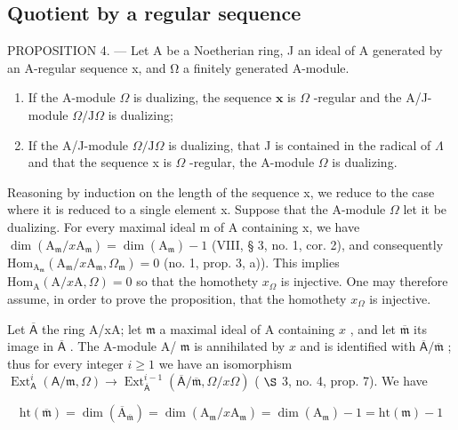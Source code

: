 \subsection{Quotient by a regular sequence}

PROPOSITION 4. --- Let A be a Noetherian ring, J an ideal of A generated by an A-regular sequence x, and Ω a finitely generated A-module.

\begin{enumerate}
\def\labelenumi{\alph{enumi})}
\item
  If the A-module \(\Omega\) is dualizing, the sequence \(\mathbf{x}\) is \(\Omega\) -regular and the A/J-module \(\Omega/\mathrm{J}\Omega\) is dualizing;
\item
  If the A/J-module \(\Omega/\mathrm{J}\Omega\) is dualizing, that J is contained in the radical of \(\Lambda\) and that the sequence x is \(\Omega\) -regular, the A-module \(\Omega\) is dualizing.
\end{enumerate}

Reasoning by induction on the length of the sequence x, we reduce to the case where it is reduced to a single element x. Suppose that the A-module \(\Omega\) let it be dualizing. For every maximal ideal m of A containing x, we have \(\dim(\mathrm{A}_{\mathfrak{m}}/x\mathrm{A}_{\mathfrak{m}})=\dim(\mathrm{A}_{\mathfrak{m}})-1\) (VIII, § 3, no. 1, cor. 2), and consequently \(\mathrm{Hom}_{\mathrm{A}_{\mathfrak{m}}}\left(\mathrm{A}_{\mathfrak{m}} / x\mathrm{A}_{\mathfrak{m}}, \Omega_{\mathfrak{m}}\right) = 0\) (no. 1, prop. 3, a)). This implies \(\mathrm{Hom}_{\mathrm{A}}(\mathrm{A} / x\mathrm{A}, \Omega) = 0\) so that the homothety \(x_{\Omega}\) is injective. One may therefore assume, in order to prove the proposition, that the homothety \(x_{\Omega}\) is injective.

Let \(\overline{\mathsf{A}}\) the ring A/xA; let \(\mathfrak{m}\) a maximal ideal of A containing \(x\) , and let \(\overline{\mathfrak{m}}\) its image in \(\overline{\mathsf{A}}\) . The A-module A/ \(\mathfrak{m}\) is annihilated by \(x\) and is identified with \(\overline{\mathsf{A}}/\overline{\mathfrak{m}}\) ; thus for every integer \(i \geqslant 1\) we have an isomorphism \(\operatorname{Ext}_{\mathsf{A}}^{i}(\mathsf{A}/\mathfrak{m}, \Omega) \longrightarrow \operatorname{Ext}_{\overline{\mathsf{A}}}^{i-1}(\overline{\mathsf{A}}/\overline{\mathfrak{m}}, \Omega/x\Omega)\) ( \(\S\) 3, no. 4, prop. 7). We have

\[
\mathrm{ht} (\overline {{\mathfrak {m}}}) = \dim (\overline {{\mathrm{A}}} _ {\overline {{\mathfrak {m}}}}) = \dim (\mathrm{A} _ {\mathfrak {m}} / x \mathrm{A} _ {\mathfrak {m}}) = \dim (\mathrm{A} _ {\mathfrak {m}}) - 1 = \mathrm{ht} (\mathfrak {m}) - 1
\]

